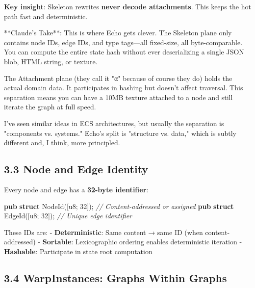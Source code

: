 \documentclass[
  11pt,
]{book}
\newenvironment{Shaded}{}{}
\newcommand{\CommentTok}[1]{\textcolor[rgb]{0.38,0.63,0.69}{\textit{#1}}}
\newcommand{\DataTypeTok}[1]{\textcolor[rgb]{0.56,0.13,0.00}{#1}}
\newcommand{\DecValTok}[1]{\textcolor[rgb]{0.25,0.63,0.44}{#1}}
\newcommand{\KeywordTok}[1]{\textcolor[rgb]{0.00,0.44,0.13}{\textbf{#1}}}
\newcommand{\NormalTok}[1]{#1}
\newcommand{\OperatorTok}[1]{\textcolor[rgb]{0.40,0.40,0.40}{#1}}
\begin{document}
\textbf{Key insight}: Skeleton rewrites \textbf{never decode
attachments}. This keeps the hot path fast and deterministic.

\begin{claudecommentary}
**Claude's Take**: This is where Echo gets clever. The Skeleton plane only contains node IDs, edge IDs, and type tags—all fixed-size, all byte-comparable. You can compute the entire state hash without ever deserializing a single JSON blob, HTML string, or texture.

The Attachment plane (they call it "α" because of course they do) holds the actual domain data. It participates in hashing but doesn't affect traversal. This separation means you can have a 10MB texture attached to a node and still iterate the graph at full speed.

I've seen similar ideas in ECS architectures, but usually the separation is "components vs. systems." Echo's split is "structure vs. data," which is subtly different and, I think, more principled.
\end{claudecommentary}

\subsection{3.3 Node and Edge Identity}\label{node-and-edge-identity}

Every node and edge has a \textbf{32-byte identifier}:

\begin{Shaded}
\begin{Highlighting}[]
\KeywordTok{pub} \KeywordTok{struct}\NormalTok{ NodeId([}\DataTypeTok{u8}\OperatorTok{;} \DecValTok{32}\NormalTok{])}\OperatorTok{;}  \CommentTok{// Content{-}addressed or assigned}
\KeywordTok{pub} \KeywordTok{struct}\NormalTok{ EdgeId([}\DataTypeTok{u8}\OperatorTok{;} \DecValTok{32}\NormalTok{])}\OperatorTok{;}  \CommentTok{// Unique edge identifier}
\end{Highlighting}
\end{Shaded}

These IDs are: - \textbf{Deterministic}: Same content → same ID (when
content-addressed) - \textbf{Sortable}: Lexicographic ordering enables
deterministic iteration - \textbf{Hashable}: Participate in state root
computation

\subsection{3.4 WarpInstances: Graphs Within
Graphs}\label{warpinstances-graphs-within-graphs}
\end{document}
